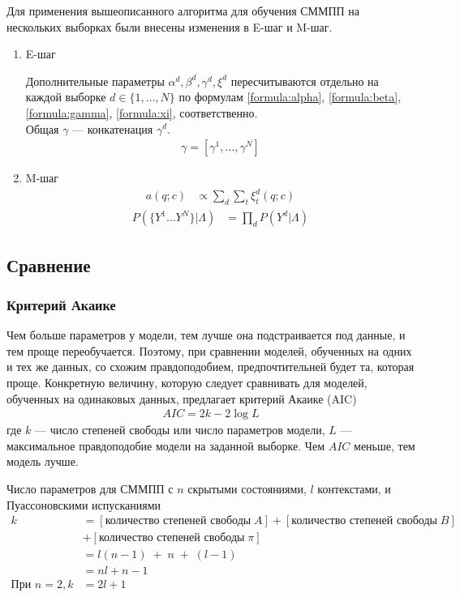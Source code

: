 \documentclass{matmex-diploma-custom}
\begin{document}
Для применения вышеописанного алгоритма для обучения СММПП на нескольких выборках были внесены изменения в E-шаг и M-шаг.
\\
\begin{enumerate}
\item E-шаг

Дополнительные параметры $\alpha^{d}, \beta^{d}, \gamma^{d}, \xi^{d}$ пересчитываются отдельно на каждой выборке $d \in \{1, \ldots, N\}$ по формулам
\ref{formula:alpha}, \ref{formula:beta}, \ref{formula:gamma}, \ref{formula:xi}, соответственно.
\\
Общая $\gamma$ --- конкатенация $\gamma^{d}$.
\begin{align}
\gamma = [\gamma^{1}, \ldots ,\gamma^{N}] 
\end{align}
\item M-шаг
\begin{align}
a(q; c) &\propto \sum_{d}{\sum_{t}{\xi^{d}_{t}(q;c)}} 
\end{align}
\begin{align}
P(\{Y^{1} \ldots Y^{N}\}|\Lambda) &= \prod_{d}{P(Y^{d}|\Lambda)}
\end{align}

\end{enumerate}

\subsection{Сравнение}
\subsubsection*{Критерий Акаике}
Чем больше параметров у модели, тем лучше она подстраивается под данные, и тем проще переобучается. 
Поэтому, при сравнении моделей, обученных на одних и тех же данных, со схожим правдоподобием, предпочтительней будет та, которая проще. 
Конкретную величину, которую следует сравнивать для моделей, обученных на одинаковых данных, предлагает критерий Акаике (AIC)
\begin{align}
AIC = 2k-2\log{L}
\end{align}
где $ k $ --- число степеней свободы или число параметров модели, $ L $ --- максимальное правдоподобие модели на заданной выборке. Чем $AIC$ меньше, тем модель лучше. 

Число параметров для СММПП с $ n $ скрытыми состояниями, $ l $ контекстами, и Пуассоновскими испусканиями 
\begin{align}
k &= [\text{количество степеней свободы} \; A ] \nonumber
+ [\text{количество степеней свободы} \; B ] \nonumber
\\&+ [\text{количество степеней свободы} \; \pi ] \nonumber
\\ &= l(n-1)\;+\;n\;+\;(l-1) \nonumber\\&= nl + n - 1
\\ 
\text{При } n=2, k &= 2l + 1 \nonumber
\end{align}
\end{document}
